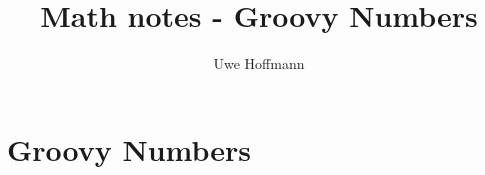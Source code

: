 

\title{Math notes - Groovy Numbers}
\author{Uwe Hoffmann}



\setcounter{chapter}{1}
\chapter*{Groovy Numbers}
